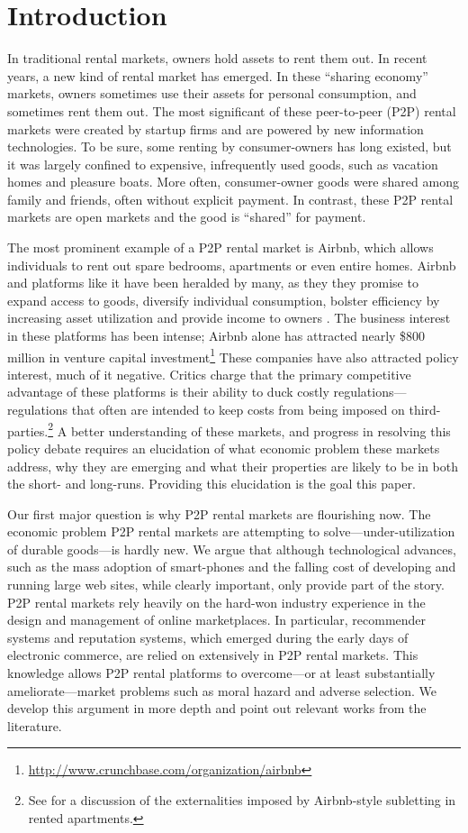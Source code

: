 \documentclass[11pt]{article}
\begin{document}
\section{Introduction}
In traditional rental markets, owners hold assets to rent them out.
In recent years, a new kind of rental market has emerged. 
In these ``sharing economy'' markets, owners sometimes use their assets for personal consumption, and sometimes rent them out.
The most significant of these peer-to-peer (P2P) rental markets were created by startup firms and are powered by new information technologies. 
To be sure, some renting by consumer-owners has long existed, but it was largely confined to expensive, infrequently used goods, such as vacation homes and pleasure boats.
More often, consumer-owner goods were shared among family and friends, often without explicit payment.
In contrast, these P2P rental markets are open markets and the good is ``shared'' for payment. 

The most prominent example of a P2P rental market is Airbnb, which allows individuals to rent out spare bedrooms, apartments or even entire homes. 
Airbnb and platforms like it have been heralded by many, as they they promise to expand access to goods, diversify individual consumption, bolster efficiency by increasing asset utilization and provide income to owners \citep{sundararajan2013zipcar}.
The business interest in these platforms has been intense; Airbnb alone has attracted nearly \$800 million in venture capital investment\footnote{\href{http://www.crunchbase.com/organization/airbnb}{http://www.crunchbase.com/organization/airbnb}}
These companies have also attracted policy interest, much of it negative. 
Critics charge that the primary competitive advantage of these platforms is their ability to duck costly regulations---regulations that often are intended to keep costs from being imposed on third-parties.\footnote{
  See \cite{horton2014tragedy} for a discussion of the externalities imposed by Airbnb-style subletting in rented apartments.
}   
A better understanding of these markets, and progress in resolving this policy debate requires an elucidation of what economic problem these markets address, why they are emerging and what their properties are likely to be in both the short- and long-runs. 
Providing this elucidation is the goal this paper. 

Our first major question is why P2P rental markets are flourishing now.
The economic problem P2P rental markets are attempting to solve---under-utilization of durable goods---is hardly new.  
We argue that although technological advances, such as the mass adoption of smart-phones and the falling cost of developing and running large web sites, while clearly important, only provide part of the story. 
P2P rental markets rely heavily on the hard-won industry experience in the design and management of online marketplaces.
In particular, recommender systems and reputation systems, which emerged during the early days of electronic commerce, are relied on extensively in P2P rental markets.  
This knowledge allows P2P rental platforms to overcome---or at least substantially ameliorate---market problems such as moral hazard and adverse selection.  
We develop this argument in more depth and point out relevant works from the literature. 
\end{document}
